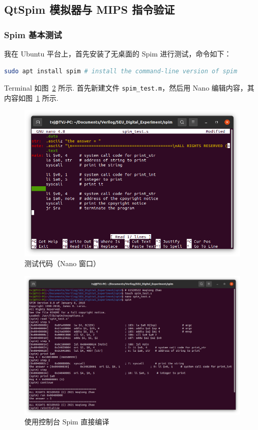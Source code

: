 \documentclass[11pt]{SEU-Digital-Report}
\begin{document}
    \subsection{QtSpim 模拟器与 MIPS 指令验证}

      \subsubsection{Spim 基本测试}

      我在 Ubuntu 平台上，首先安装了无桌面的 Spim 进行测试，命令如下：
    \begin{lstlisting}[language=sh,title={Install Spim on Ubuntu}]
sudo apt install spim # install the command-line version of spim
    \end{lstlisting}

    Terminal 如图~\ref{fig:terminal_spim} 所示.
    首先新建文件 \texttt{spim\_test.m}，然后用 Nano 编辑内容，其内容如图~\ref{fig:terminal_nano} 所示.

    \begin{figure}[htbp]
      \centering
      \includegraphics[width=.65\linewidth]{fig/spim/terminal_nano.png}
      \caption{测试代码（Nano 窗口）}
      \label{fig:terminal_nano}
    \end{figure}

    \begin{figure}[htbp]
      \centering
      \includegraphics[width=\linewidth]{fig/spim/terminal_spim.png}
      \caption{使用控制台 Spim 直接编译}
      \label{fig:terminal_spim}
    \end{figure}
\end{document}
